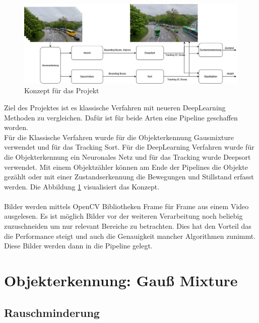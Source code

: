 \documentclass[conference]{IEEEtran}
\begin{document}
	\begin{figure}[!h]
		\begin{center}
			\includegraphics[width=16cm]{Media/KonzeptVAOT.png}
			\caption{Konzept für das Projekt}
			\label{Konzept}
		\end{center}
	\end{figure}
	Ziel des Projektes ist es klassische Verfahren mit neueren DeepLearning Methoden zu vergleichen.
	Dafür ist für beide Arten eine Pipeline geschaffen worden.\\
	Für die Klassische Verfahren wurde für die Objekterkennung Gausmixture verwendet und für das Tracking Sort. Für die DeepLearning Verfahren wurde für die Objekterkennung ein Neuronales Netz  und für das Tracking wurde Deepsort verwendet. Mit einem Objektzähler können am Ende der Pipelines die Objekte gezählt oder mit einer Zustandserkennung die Bewegungen und Stillstand erfasst werden. Die Abbildung \ref{Konzept} visualisiert das Konzept.\\
	\\
	Bilder werden mittels OpenCV Bibliotheken Frame für Frame aus einem Video ausgelesen.
	Es ist möglich Bilder vor der weiteren Verarbeitung noch beliebig zuzuschneiden um nur relevant Bereiche zu betrachten. Dies hat den Vorteil das die Performance steigt und auch die Genauigkeit mancher Algorithmen zunimmt. Diese Bilder werden dann in die Pipeline gelegt.
	
	\section{Objekterkennung: Gauß Mixture}
	
	\subsection{Rauschminderung}
	
\end{document}
